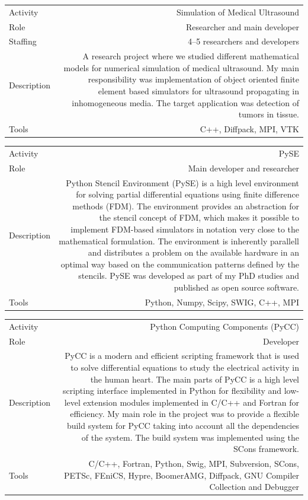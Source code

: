 \documentclass[english,a4paper,11pt]{article}
\begin{document}
\begin{tabular}{@{}LR}
Activity & Simulation of Medical Ultrasound \\ 
Role & Researcher and main developer \\ 
Staffing & 4--5 researchers and developers \\ 
Description & A research project where we studied different mathematical models for numerical simulation of medical ultrasound. My main responsibility was implementation of object oriented finite element based simulators for ultrasound propagating in inhomogeneous media. The target application was detection of tumors in tissue. \\ 
Tools & C++, Diffpack, MPI, VTK \\ 
\end{tabular}

\begin{tabular}{@{}LR}
Activity & PySE \\ 
Role & Main developer and researcher \\ 
Description & Python Stencil Environment (PySE) is a high level environment for solving partial differential equations using finite difference methods (FDM). The environment provides an abstraction for the stencil concept of FDM, which makes it possible to implement FDM-based simulators in notation very close to the mathematical formulation. The environment is inherently parallell and distributes a problem on the available hardware in an optimal way based on the communication patterns defined by the stencils. PySE was developed as part of my PhD studies and published as open source software. \\ 
Tools & Python, Numpy, Scipy, SWIG, C++, MPI \\ 
\end{tabular}

\begin{tabular}{@{}LR}
Activity & Python Computing Components (PyCC) \\ 
Role & Developer \\ 
Description & PyCC is a modern and efficient scripting framework that is used to solve differential equations to study the electrical activity in the human heart. The main parts of PyCC is a high level scripting interface implemented in Python for flexibility and low-level extension modules implemented in C/C++ and Fortran for efficiency. My main role in the project was to provide a flexible build system for PyCC taking into account all the dependencies of the system. The build system was implemented using the SCons framework. \\ 
Tools & C/C++, Fortran, Python, Swig, MPI, Subversion, SCons, PETSc, FEniCS, Hypre, BoomerAMG, Diffpack, GNU Compiler Collection and Debugger \\ 
\end{tabular}
\end{document}
